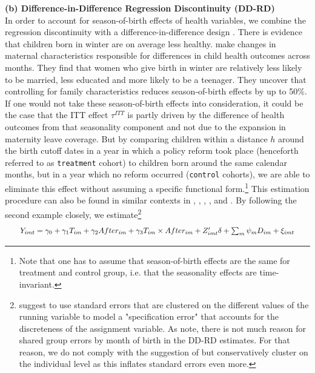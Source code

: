 \documentclass[a4paper ]{article}
\begin{document}
\bigskip
\textbf{(b) Difference-in-Difference Regression Discontinuity (DD-RD)}\smallskip\\
In order to account for season-of-birth effects of health variables, we combine the regression discontinuity with a difference-in-difference design \citep{bound2000compulsory}. There is evidence that children born in winter are on average less healthy. \cite{buckles2013season} make changes in maternal characteristics responsible for differences in child health outcomes across months. They find that women who give birth in winter are relatively less likely to be married, less educated and more likely to be a teenager. They uncover that controlling for family characteristics reduces season-of-birth effects by up to 50\%.\newline
If one would not take these season-of-birth effects into consideration, it could be the case that the ITT effect $\tau^{ITT}$ is partly driven by the difference of health outcomes from that seasonality component and not due to the expansion in maternity leave coverage. But by comparing children within a distance $h$ around the birth cutoff dates in a year in which a policy reform took place (henceforth referred to as \texttt{treatment} cohort) to children born around the same calendar months, but in a year which no reform occurred (\texttt{control} cohorts), we are able to eliminate this effect without assuming a specific functional form.\footnote{Note that one has to assume that season-of-birth effects are the same for treatment and control group, i.e. that the seasonality effects are time-invariant.} This estimation procedure can also be found in similar contexts in \cite{lalive2009does}, \cite{dustmann2012expansions}, \cite{lalive2013parental}, \cite{ekberg2013parental}, and \cite{schonberg2014expansions}. By following the second example closely, we estimate\footnote{\cite{lee2008regression} suggest to use standard errors that are clustered on the different values of the running variable to model a "specification error" that accounts for the discreteness of the assignment variable. As \cite{dustmann2012expansions} note, there is not much reason for shared group errors by month of birth in the DD-RD estimates. For that reason, we do not comply with the suggestion of \cite{lee2008regression} but conservatively cluster on the individual level as this inflates standard errors even more.}
\begin{align}
\resizebox{.94 \textwidth}{!} 
{$Y_{imt} = \gamma_0 + \gamma_1 T_{im} + \gamma_2 After_{im}+ \gamma_3 T_{im} \times After_{im} +  Z_{imt}' \delta + \sum_{m} \psi_m D_{im} +\xi_{imt} $}\label{eq:RD+DD}
\end{align}
\end{document}
